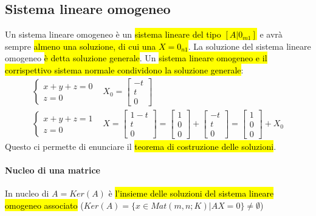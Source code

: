\subsection{Sistema lineare omogeneo}
Un sistema lineare omogeneo è un \hl{sistema lineare del tipo $[A|0_{m1}]$} e avrà
sempre \hl{almeno una soluzione, di cui una $X=0_{n1}$}. La soluzione del sistema
lineare omogeneo \hl{è detta soluzione generale}. Un \hl{sistema lineare omogeneo e
il corrispettivo sistema normale condividono la soluzione generale}:
\begin{align*}
    \begin{cases}
        x + y + z = 0 \\
        z = 0
    \end{cases} & X_0 =
    \begin{bmatrix}
        -t \\
        t \\
        0
    \end{bmatrix} \\
    \begin{cases}
        x + y + z = 1 \\
        z = 0
    \end{cases} & X =
    \begin{bmatrix}
        1-t \\
        t \\
        0
    \end{bmatrix} =
    \begin{bmatrix}
        1 \\
        0 \\
        0
    \end{bmatrix} +
    \begin{bmatrix}
        -t \\
        t \\
        0
    \end{bmatrix} =
    \begin{bmatrix}
        1 \\
        0 \\
        0
    \end{bmatrix} + X_0
\end{align*}
Questo ci permette di enunciare il \hl{teorema di costruzione delle soluzioni}.

\paragraph{Nucleo di una matrice} In nucleo di $A = Ker(A)$ è \hl{l'insieme delle
soluzioni del sistema lineare omogeneo associato}
($Ker(A) = \{x \in Mat(m,n;K) | AX = 0\} \neq \emptyset$)

